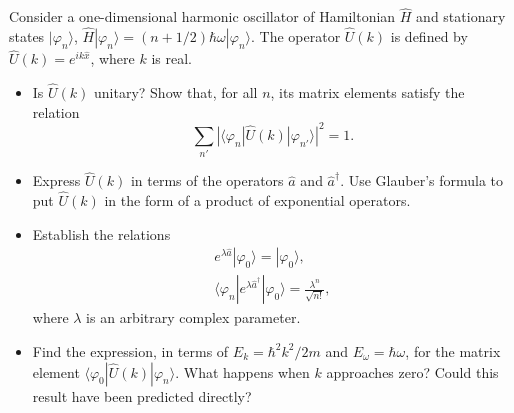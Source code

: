 \documentclass[12pt,a4paper]{article}
\newenvironment{problem}[2][Problem]{\begin{trivlist}
\item[\hskip \labelsep {\bfseries #1}\hskip \labelsep {\bfseries #2.}]}{\end{trivlist}}
\begin{document}
\begin{problem}{4}
[C-T Exercise 5-7] Consider a one-dimensional harmonic oscillator of Hamiltonian $\hat{H}$ and stationary states $|\varphi_n\rangle$, $\hat{H}|\varphi_n\rangle=(n+1/2)\hbar\omega|\varphi_n\rangle$. The operator $\hat{U}(k)$ is defined by $\hat{U}(k)=e^{ik\hat{x}}$, where $k$ is real.
\begin{itemize}
\item[(a)] Is $\hat{U}(k)$ unitary? Show that, for all $n$, its matrix elements satisfy the relation
\[
\sum_{n'}|\langle\varphi_n|\hat{U}(k)|\varphi_{n'}\rangle|^2=1.
\]
\item[(b)] Express $\hat{U}(k)$ in terms of the operators $\hat{a}$ and $\hat{a}^{\dagger}$. Use Glauber's formula to put $\hat{U}(k)$ in the form of a product of exponential operators.
\item[(c)] Establish the relations
\begin{gather*}
e^{\lambda\hat{a}}|\varphi_0\rangle=|\varphi_0\rangle,\\
\langle\varphi_n|e^{\lambda\hat{a}^{\dagger}}|\varphi_0\rangle=\frac{\lambda^n}{\sqrt{n!}},
\end{gather*}
where $\lambda$ is an arbitrary complex parameter.
\item[(d)] Find the expression, in terms of $E_k=\hbar^2k^2/2m$ and $E_{\omega}=\hbar\omega$, for the matrix element $\langle\varphi_0|\hat{U}(k)|\varphi_n\rangle$. What happens when $k$ approaches zero? Could this result have been predicted directly?
\end{itemize}
\end{problem}
\end{document}
